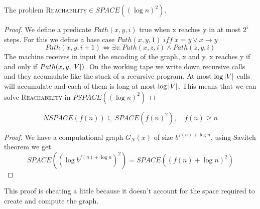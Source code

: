 \begin{theorem}
    The problem \textsc{Reachability}$\in SPACE((\log{n})^2)$.
    \begin{proof}
        We define a predicate $Path(x,y,i)$ true when x reaches y in at most $2^i$ steps. For this we define a base case $Path(x,y,1)\; iff \; x =y \vee x \rightarrow y$
        \[ 
            Path(x,y,i+1) \Longleftrightarrow \exists z: Path(x,z,i) \wedge Path(z,y,i) 
        \]
        The machine receives in input the encoding of the graph, x and y. x reaches y if and only if $Path(x,y, \left\lvert V\right\rvert)$. On the working tape we write down recursive calls and they accumulate like the stack of a recursive program. At most $\log{\left\lvert V\right\rvert}$ calls will accumulate and each of them is long at most $\log{\left\lvert V\right\rvert}$. This means that we can solve \textsc{Reachability} in $PSPACE((\log{n})^2)$
    \end{proof}
\end{theorem}
\begin{corollary}
    \[ 
        NSPACE(f(n)) \subseteq SPACE(f(n)^2),\quad f(n) \geq n
    \]
    \begin{proof}
        We have a computational graph $G_N(x)$ of size $b^{f(n)+\log{n}}$, using Savitch theorem we get
        \[ 
            SPACE((\log{b^{f(n)+\log{n}}})^2) = SPACE((f(n)+\log{n})^2)
        \]
    \end{proof}
    This proof is cheating a little because it doesn't account for the space required to create and compute the graph.
\end{corollary}